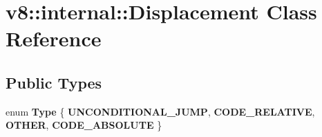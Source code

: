 \hypertarget{classv8_1_1internal_1_1Displacement}{}\section{v8\+:\+:internal\+:\+:Displacement Class Reference}
\label{classv8_1_1internal_1_1Displacement}
\subsection*{Public Types}
\begin{DoxyCompactItemize}
\item 
\mbox{\label{classv8_1_1internal_1_1Displacement_a8b824f2defb390173ce430a1f779d69a}} 
enum {\bfseries Type} \{ {\bfseries U\+N\+C\+O\+N\+D\+I\+T\+I\+O\+N\+A\+L\+\_\+\+J\+U\+MP}, 
{\bfseries C\+O\+D\+E\+\_\+\+R\+E\+L\+A\+T\+I\+VE}, 
{\bfseries O\+T\+H\+ER}, 
{\bfseries C\+O\+D\+E\+\_\+\+A\+B\+S\+O\+L\+U\+TE}
 \}
\end{DoxyCompactItemize}
